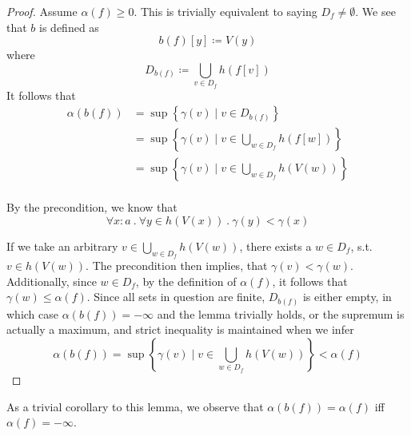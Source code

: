 \documentclass{article}
\newtheorem{theorem}{Theorem}[section]
\newtheorem{lemma}[theorem]{Lemma}
\newcommand{\iteDef}[4]{
  #1 \coloneqq \left\{
\begin{array}{ll}
      #2 &; #3 \\
      #4 &; \text{otherwise}\\
\end{array} 
\right. 
}
\newcommand{\op}{\textsc{Op}}
\newcommand{\mop}{\textsc{mapOp}}
\newcommand{\mapg}{\textsc{mapG}}
\begin{document}
\begin{proof}
Assume $\alpha(f) \ge 0$. This is trivially equivalent to saying $D_f \ne \emptyset$.
We see that $b$ is defined as
\[
b(f)[y] \coloneqq V(y)
\]
where 
\[
D_{b(f)} \coloneqq \bigcup_{v \in D_f} h(f[v])
\]
It follows that 
\begin{align*} 
\alpha(b(f)) &= \sup\left\{ \gamma(v) \mid v \in D_{b(f)} \right\} \\
&= \sup\left\{ \gamma(v) \mid v \in \bigcup_{w \in D_f} h(f[w]) \right\} \\
&= \sup\left\{ \gamma(v) \mid v \in \bigcup_{w \in D_f} h(V(w)) \right\} \\
\end{align*}

By the precondition, we know that 
\[
\forall x\colon a \ .\ \forall y \in h(V(x)) \ .\ \gamma(y) < \gamma(x) 
\]

If we take an arbitrary $v \in \bigcup_{w \in D_f} h(V(w))$, there exists a
$w \in D_f$, s.t. $v \in h(V(w))$. The precondition then implies, that $\gamma(v) < \gamma(w)$.
Additionally, since $w \in D_f$, by the definition of $\alpha(f)$, it follows that $\gamma(w) \le \alpha(f)$.
Since all sets in question are finite, $D_{b(f)}$ is either empty, in which case $\alpha(b(f)) = -\infty$ and the lemma trivially holds, or the supremum is actually a maximum, and strict inequality is maintained when we infer
\[
\alpha(b(f)) = \sup\left\{ \gamma(v) \mid v \in \bigcup_{w \in D_f} h(V(w)) \right\} < \alpha(f)
\]
\end{proof}
As a trivial corollary to this lemma, we observe that $\alpha(b(f)) = \alpha(f)$ iff $\alpha(f) = -\infty$.





\end{document}
